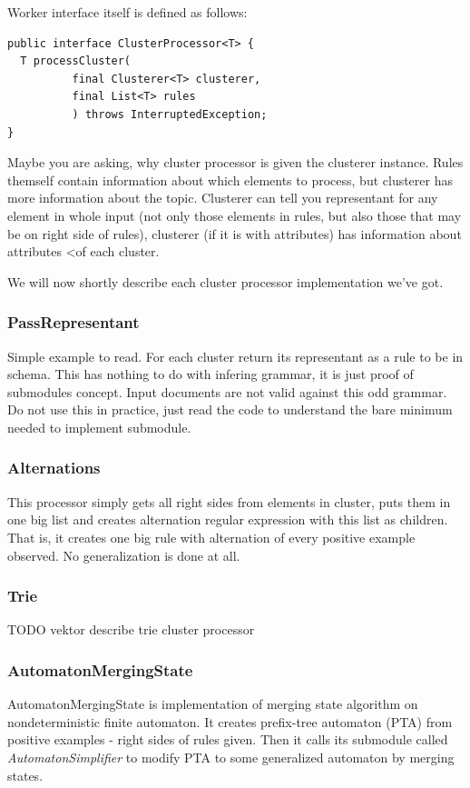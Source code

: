 \documentclass[a4paper,10pt,oneside]{article}
\newcommand{\jmodule}[1]{\emph{#1}}
\begin{document}
Worker interface itself is defined as follows:
\begin{verbatim}
public interface ClusterProcessor<T> {
  T processCluster(
          final Clusterer<T> clusterer,
          final List<T> rules
          ) throws InterruptedException;
}
\end{verbatim}
Maybe you are asking, why cluster processor is given the clusterer instance.
Rules themself contain information about which elements to process, but clusterer has more information
about the topic.
Clusterer can tell you representant for any element in whole input (not only those elements in rules, but also those that may be on right side of rules), clusterer (if it is with attributes) has information about attributes <of each cluster.

We will now shortly describe each cluster processor implementation we've got.

\subsubsection{PassRepresentant}
Simple example to read. For each cluster return its representant as a rule to be in schema.
This has nothing to do with infering grammar, it is just proof of submodules concept.
Input documents are not valid against this odd grammar.
Do not use this in practice, just read the code to understand the bare minimum needed to implement submodule.

\subsubsection{Alternations}
This processor simply gets all right sides from elements in cluster, puts them in one big list and creates alternation regular expression with this list as children.
That is, it creates one big rule with alternation of every positive example observed.
No generalization is done at all.

\subsubsection{Trie}
TODO vektor describe trie cluster processor

\subsubsection{AutomatonMergingState}
AutomatonMergingState is implementation of merging state algorithm on nondeterministic finite automaton.
It creates prefix-tree automaton (PTA) from positive examples - right sides of rules given.
Then it calls its submodule called \jmodule{AutomatonSimplifier} to  modify PTA to some generalized 
automaton by merging states.
\end{document}
